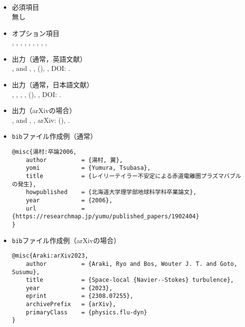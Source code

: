 \documentclass[a4paper,fleqn,uplatex,dvipdfmx]{jsarticle}
\begin{document}
\subsection{\ttmisc}
\label{ssec:misc}
\begin{tcolorbox}[enhanced, title=\ttmisc, drop fuzzy shadow]
    \begin{itemize}
        \item 必須項目 \\
        無し
        \item オプション項目 \\
        \ttauthor, \tttitle, \tthowpublished, \ttarchivePrefix, \tteprint, \ttmonth, \ttyear, \ttnote, \ttkey, \ttdoi
        \item 出力（通常，英語文献） \\
            \colorbox[gray]{0.8}{\ttauthorf}, \colorbox[gray]{0.8}{\ttauthors} and \colorbox[gray]{0.8}{\ttauthort}, \colorbox[gray]{0.8}{\tttitle}, \colorbox[gray]{0.8}{\tthowpublished} (\colorbox[gray]{0.8}{\ttyear}), \colorbox[gray]{0.8}{\ttnote}, DOI: \colorbox[gray]{0.8}{\ttdoi}.
        \item 出力（通常，日本語文献） \\
            \colorbox[gray]{0.8}{\ttauthorf}, \colorbox[gray]{0.8}{\ttauthors}, \colorbox[gray]{0.8}{\ttauthort}, \colorbox[gray]{0.8}{\tttitle}, \colorbox[gray]{0.8}{\tthowpublished} (\colorbox[gray]{0.8}{\ttyear}), \colorbox[gray]{0.8}{\ttnote}, DOI: \colorbox[gray]{0.8}{\ttdoi}.
        \item 出力（arXivの場合） \\
            \colorbox[gray]{0.8}{\ttauthorf}, \colorbox[gray]{0.8}{\ttauthors} and \colorbox[gray]{0.8}{\ttauthort}, \colorbox[gray]{0.8}{\tttitle}, arXiv: \colorbox[gray]{0.8}{\tteprint} (\colorbox[gray]{0.8}{\ttyear}), \colorbox[gray]{0.8}{\ttnote}.
        \item \verb|bib|ファイル作成例（通常） \vspace{-3mm}
\begin{verbatim}
@misc{湯村:卒論2006,
    author          = {湯村, 翼},
    yomi            = {Yumura, Tsubasa},
    title           = {レイリーテイラー不安定による赤道電離圏プラズマバブルの発生},
    howpublished    = {北海道大学理学部地球科学科卒業論文},
    year            = {2006},
    url             = {https://researchmap.jp/yumu/published_papers/1902404}
}
\end{verbatim}
        \item \verb|bib|ファイル作成例（arXivの場合） \vspace{-3mm}
\begin{verbatim}
@misc{Araki:arXiv2023,
    author          = {Araki, Ryo and Bos, Wouter J. T. and Goto, Susumu},
    title           = {Space-local {Navier--Stokes} turbulence}, 
    year            = {2023},
    eprint          = {2308.07255},
    archivePrefix   = {arXiv},
    primaryClass    = {physics.flu-dyn}
}
\end{verbatim}
    \end{itemize}
\end{tcolorbox}
\end{document}
